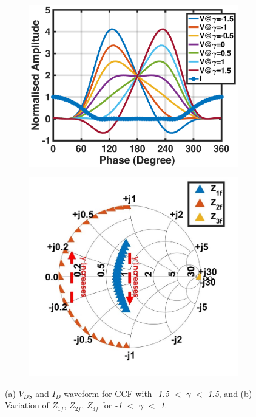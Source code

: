 \documentclass[conference]{IEEEtran}
\begin{document}
\begin{figure}[!t]
\captionsetup{font=footnotesize}
\centering
\begin{subfigure}{0.24\textwidth}
\centering
\includegraphics[width=1\textwidth]{Images/CCF/CCF_wave_VI.pdf}
\caption{}
\label{fig:CCF_wave_VI}
\end{subfigure}
\begin{subfigure}{0.24\textwidth}
\includegraphics[width=1\textwidth]{Images/CCF/CCF_SC.jpg}
\caption{}
\label{fig:CCF_SC}
\end{subfigure}
\caption{(a) $V_{DS}$ and $I_D$ waveform for CCF with \textit{-1.5} $<$ $\gamma$ $<$ \textit{1.5}, and (b) Variation of $Z_{1f}$, $Z_{2f}$, $Z_{3f}$ for \textit{-1} $<$ $\gamma$ $<$ \textit{1}.}
\label{fig:CCF_VI_SC}
\vspace{-0.2in}
\end{figure}
\end{document}
